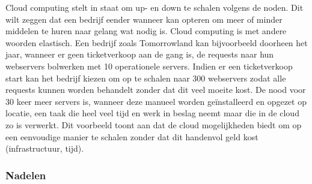 \begin{description}[style=unboxed, labelwidth=\linewidth, listparindent =0pt]
    \item [Schaalbaarheid en flexibiliteit]
    Cloud computing stelt in staat om up- en down te schalen volgens de noden. Dit wilt zeggen dat een bedrijf eender wanneer kan opteren om meer of minder middelen te huren naar gelang wat nodig is. Cloud computing is met andere woorden elastisch. Een bedrijf zoals Tomorrowland kan bijvoorbeeld doorheen het jaar, wanneer er geen ticketverkoop aan de gang is, de requests naar hun webservers bolwerken met 10 operationele servers. Indien er een ticketverkoop start kan het bedrijf kiezen om op te schalen naar 300 webservers zodat alle requests kunnen worden behandelt zonder dat dit veel moeite kost. De nood voor 30 keer meer servers is, wanneer deze manueel worden geïnstalleerd en opgezet op locatie, een taak die heel veel tijd en werk in beslag neemt maar die in de cloud zo is verwerkt. Dit voorbeeld toont aan dat de cloud mogelijkheden biedt om op een eenvoudige manier te schalen zonder dat dit handenvol geld kost (infrastructuur, tijd).
    \newline
  
\end{description}

\subsubsection{Nadelen}


